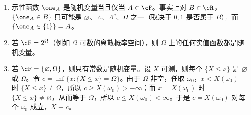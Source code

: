 \begin{example}\label{ex:random-variables:basic}
\begin{enumerate}
\item 示性函数 $\one_A$ 是随机变量当且仅当 $A\in\cF$。事实上对 $B\in\cR$，$\{\one_A\in B\}$ 只可能是 $\varnothing$、$A$、$A^c$、$\Omega$ 之一（取决于 $0,1$ 是否属于 $B$），而 $\{\one_A\in\{1\}\}=A$。
\item 若 $\cF=2^\Omega$（例如 $\Omega$ 可数的离散概率空间），则 $\Omega$ 上的任何实值函数都是随机变量。
\item 若 $\cF=\{\varnothing,\Omega\}$，则只有常数是随机变量。设 $X$ 可测，则每个 $\{X\leqslant x\}$ 是 $\varnothing$ 或 $\Omega$。令 $c=\inf\{x:\{X\leqslant x\}=\Omega\}$。由于 $\Omega$ 非空，任取 $\omega_0$，$x<X(\omega_0)$ 时 $\{X\leqslant x\}\neq\Omega$，所以 $c\geqslant X(\omega_0)>-\infty$；而 $x=X(\omega_0)$ 时 $\{X\leqslant x\}\neq\varnothing$，从而等于 $\Omega$，所以 $c\leqslant X(\omega_0)<\infty$。于是 $c=X(\omega_0)$ 对每个 $\omega_0$ 成立，$X\equiv c$。
\end{enumerate}
\end{example}

